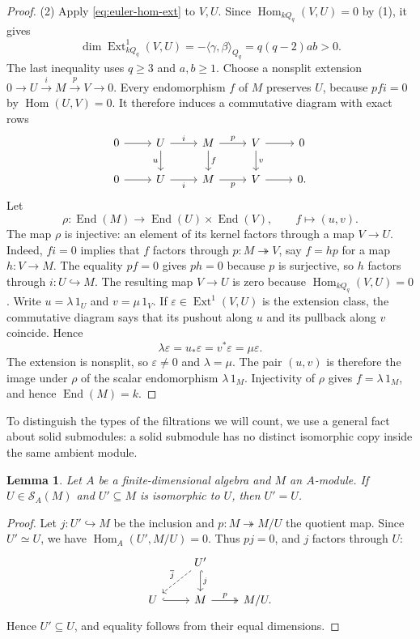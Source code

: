 \documentclass[a4paper,reqno,10pt]{amsart}
\newtheorem{lemma}[theorem]{Lemma}
\theoremstyle{definition}
\numberwithin{equation}{section}
\newcommand{\End}{\operatorname{End}}
\newcommand{\Hom}{\operatorname{Hom}}
\newcommand{\Ext}{\operatorname{Ext}}
\newcommand{\Sol}{\mathcal S}
\begin{document}
\begin{proof}
(2) Apply \eqref{eq:euler-hom-ext} to $V,U$.
Since $\Hom_{kQ_q}(V,U)=0$ by (1), it gives
\[
 \dim\Ext^1_{k Q_q}(V,U)
   =-\langle\gamma,\beta\rangle_{Q_q}=q(q-2)ab>0.
\]
The last inequality uses $q\geq3$ and $a,b\geq1$.
Choose a nonsplit extension $0\to U\xrightarrow{i}M\xrightarrow{p}V\to0$.
Every endomorphism $f$ of $M$ preserves $U$, because $pfi=0$ by
$\Hom(U,V)=0$. It therefore induces a commutative diagram with exact rows
\[
\begin{tikzcd}
 0 \arrow[r] & U \arrow[r,"i"] \arrow[d,"u"']
 & M \arrow[r,"p"] \arrow[d,"f"]
 & V \arrow[r] \arrow[d,"v"] & 0 \\
 0 \arrow[r] & U \arrow[r,"i"']
 & M \arrow[r,"p"'] & V \arrow[r] & 0.
\end{tikzcd}
\]
Let
\[
 \rho:\End(M)\longrightarrow\End(U)\times\End(V),
 \qquad f\longmapsto(u,v).
\]
The map $\rho$ is injective: an element of its kernel factors through a
map $V\to U$. Indeed, $fi=0$ implies that $f$ factors through
$p:M\twoheadrightarrow V$, say $f=hp$ for a map $h:V\to M$. The
equality $pf=0$ gives $ph=0$ because $p$ is surjective, so $h$ factors
through $i:U\hookrightarrow M$. The resulting map $V\to U$ is zero because
$\Hom_{k Q_q}(V,U)=0$.
Write $u=\lambda\,1_U$ and $v=\mu\,1_V$. If
$\varepsilon\in\Ext^1(V,U)$ is the extension class, the commutative
diagram says that its pushout along $u$ and its pullback along $v$
coincide. Hence
\[
 \lambda\varepsilon=u_*\varepsilon=v^*\varepsilon
   =\mu\varepsilon.
\]
The extension is nonsplit, so $\varepsilon\ne0$ and $\lambda=\mu$.
The pair $(u,v)$ is therefore the image under $\rho$ of the scalar
endomorphism $\lambda\,1_M$. Injectivity of $\rho$ gives
$f=\lambda\,1_M$, and hence $\End(M)=k$.
\end{proof}

To distinguish the types of the filtrations we will count, we use a
general fact about solid submodules: a solid submodule has no distinct
isomorphic copy inside the same ambient module.

\begin{lemma}\label{lem:unique-submodule}
Let $A$ be a finite-dimensional algebra and $M$ an $A$-module.
If $U\in\Sol_A(M)$ and $U'\subseteq M$ is isomorphic to $U$, then
$U'=U$.
\end{lemma}

\begin{proof}
Let $j:U'\hookrightarrow M$ be the inclusion and
$p:M\twoheadrightarrow M/U$ the quotient map. Since $U'\simeq U$, we
have $\Hom_A(U',M/U)=0$. Thus $pj=0$, and $j$ factors through $U$:
\[
\begin{tikzcd}
 & U' \arrow[d,hook,"j"] \arrow[dl,dashed,"\overline j"'] & \\
 U \arrow[r,hook] & M \arrow[r,two heads,"p"] & M/U.
\end{tikzcd}
\]
Hence $U'\subseteq U$, and equality follows from their equal dimensions.
\end{proof}
\end{document}
